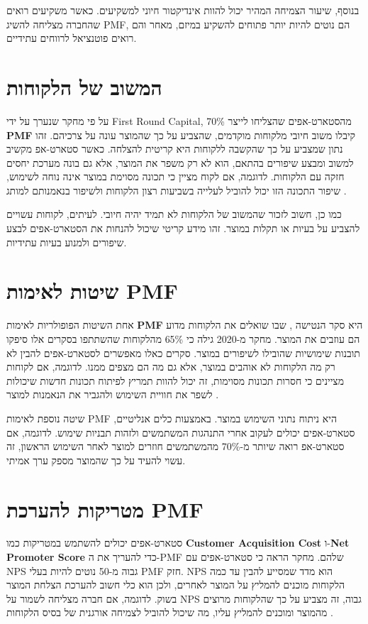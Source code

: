 בנוסף, שיעור הצמיחה המהיר יכול להוות אינדיקטור חיוני למשקיעים. כאשר משקיעים רואים שהחברה מצליחה להשיג PMF, הם נוטים להיות יותר פתוחים להשקיע במיזם, מאחר והם רואים פוטנציאל לרווחים עתידיים.

\section{המשוב של הלקוחות}
על פי מחקר שנערך על ידי First Round Capital, 70\% מהסטארט-אפים שהצליחו לייצר \textbf{PMF} קיבלו משוב חיובי מלקוחות מוקדמים, שהצביע על כך שהמוצר עונה על צרכיהם. זהו נתון שמצביע על כך שהקשבה ללקוחות היא קריטית להצלחה. כאשר סטארט-אפ מקשיב למשוב ומבצע שיפורים בהתאם, הוא לא רק משפר את המוצר, אלא גם בונה מערכת יחסים חזקה עם הלקוחות. לדוגמה, אם לקוח מציין כי תכונה מסוימת במוצר אינה נוחה לשימוש, שיפור התכונה הזו יכול להוביל לעלייה בשביעות רצון הלקוחות ולשיפור בנאמנותם למותג \cite{firstround2018}.

כמו כן, חשוב לזכור שהמשוב של הלקוחות לא תמיד יהיה חיובי. לעיתים, לקוחות עשויים להצביע על בעיות או תקלות במוצר. זהו מידע קריטי שיכול להנחות את הסטארט-אפים לבצע שיפורים ולמנוע בעיות עתידיות.

\section{שיטות לאימות PMF}
אחת השיטות הפופולריות לאימות \textbf{PMF} היא סקר הנטישה , שבו שואלים את הלקוחות מדוע הם עוזבים את המוצר. מחקר מ-2020 גילה כי 65\% מהלקוחות שהשתתפו בסקרים אלו סיפקו תובנות שימושיות שהובילו לשיפורים במוצר. סקרים כאלו מאפשרים לסטארט-אפים להבין לא רק מה הלקוחות לא אוהבים במוצר, אלא גם מה הם מצפים ממנו. לדוגמה, אם לקוחות מציינים כי חסרות תכונות מסוימות, זה יכול להוות תמריץ לפיתוח תכונות חדשות שיכולות לשפר את חוויית השימוש ולהגביר את הנאמנות למוצר \cite{bland2020startup}.

שיטה נוספת לאימות PMF היא ניתוח נתוני השימוש במוצר. באמצעות כלים אנליטיים, סטארט-אפים יכולים לעקוב אחרי התנהגות המשתמשים ולזהות תבניות שימוש. לדוגמה, אם סטארט-אפ רואה שיותר מ-70\% מהמשתמשים חוזרים למוצר לאחר השימוש הראשון, זה עשוי להעיד על כך שהמוצר מספק ערך אמיתי.

\section{מטריקות להערכת PMF}
סטארט-אפים יכולים להשתמש במטריקות כמו \textbf{Customer Acquisition Cost } ו-\textbf{Net Promoter Score } כדי להעריך את ה-PMF שלהם. מחקר הראה כי סטארט-אפים עם NPS גבוה מ-50 נוטים להיות בעלי PMF חזק. NPS הוא מדד שמסייע להבין עד כמה הלקוחות מוכנים להמליץ על המוצר לאחרים, ולכן הוא כלי חשוב להערכת הצלחת המוצר בשוק. לדוגמה, אם חברה מצליחה לשמור על NPS גבוה, זה מצביע על כך שהלקוחות מרוצים מהמוצר ומוכנים להמליץ עליו, מה שיכול להוביל לצמיחה אורגנית של בסיס הלקוחות \cite{reid2019metrics}.

